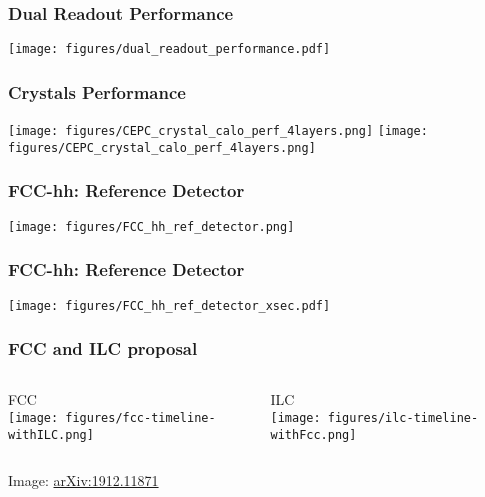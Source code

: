 \documentclass[aspectratio=169]{beamer}
\newcommand{\backupend}{%
   \setcounter{framenumber}{\value{finalframe}}
}
\begin{document}
\begin{frame}
  \frametitle{Dual Readout Performance}

  \texttt{[image: figures/dual\_readout\_performance.pdf]}
\end{frame}

\begin{frame}
  \frametitle{Crystals Performance}

  \texttt{[image: figures/CEPC\_crystal\_calo\_perf\_4layers.png]}
  \texttt{[image: figures/CEPC\_crystal\_calo\_perf\_4layers.png]}
\end{frame}


\begin{frame}
  \frametitle{FCC-hh: Reference Detector}

  \begin{adjustwidth}{-2em}{-2em}
    \texttt{[image: figures/FCC\_hh\_ref\_detector.png]}
  \end{adjustwidth}
\end{frame}

\begin{frame}
  \frametitle{FCC-hh: Reference Detector}

  \begin{adjustwidth}{-2em}{-2em}
    \texttt{[image: figures/FCC\_hh\_ref\_detector\_xsec.pdf]}
  \end{adjustwidth}
\end{frame}


\begin{frame}
  \frametitle{FCC and ILC proposal}
  \begin{columns}[c]
    \begin{center}
      FCC\\
      \texttt{[image: figures/fcc-timeline-withILC.png]}
    \end{center}
    \begin{center}
      ILC\\
      \texttt{[image: figures/ilc-timeline-withFcc.png]}
    \end{center}
  \end{columns}
  \tiny{Image: \href{https://arxiv.org/abs/1912.11871}{arXiv:1912.11871}}\\
\end{frame}

\backupend{}
\end{document}
